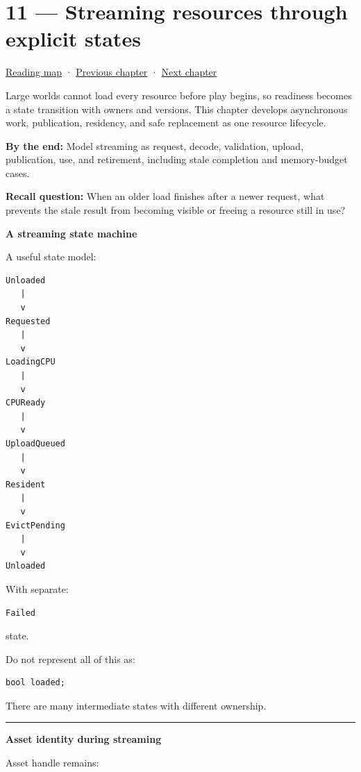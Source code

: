 \hypertarget{05-engine-i-ch011}{}
\chapter{11 --- Streaming resources through explicit states}\label{05-engine-i-ch011-streaming-resources-through-explicit-states}

\hyperref[volume-reading-map]{Reading map} · \hyperref[05-engine-i-ch010]{Previous chapter} · \hyperref[05-engine-i-ch012]{Next chapter}

Large worlds cannot load every resource before play begins, so readiness becomes a state transition with owners and versions. This chapter develops asynchronous work, publication, residency, and safe replacement as one resource lifecycle.

\textbf{By the end:} Model streaming as request, decode, validation, upload, publication, use, and retirement, including stale completion and memory-budget cases.

\textbf{Recall question:} When an older load finishes after a newer request, what prevents the stale result from becoming visible or freeing a resource still in use?

\textbf{A streaming state machine}

A useful state model:

\begin{verbatim}
Unloaded
   |
   v
Requested
   |
   v
LoadingCPU
   |
   v
CPUReady
   |
   v
UploadQueued
   |
   v
Resident
   |
   v
EvictPending
   |
   v
Unloaded
\end{verbatim}

With separate:

\begin{verbatim}
Failed
\end{verbatim}

state.

Do not represent all of this as:

\begin{verbatim}
bool loaded;
\end{verbatim}

There are many intermediate states with different ownership.

\begin{center}\rule{0.5\linewidth}{0.5pt}\end{center}

\textbf{Asset identity during streaming}

Asset handle remains:

